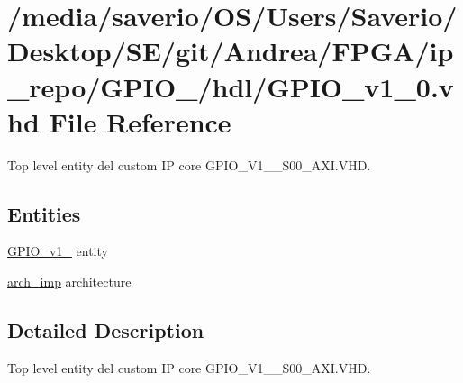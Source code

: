 \hypertarget{GPIO__v1__0_8vhd}{}\section{/media/saverio/\+O\+S/\+Users/\+Saverio/\+Desktop/\+S\+E/git/\+Andrea/\+F\+P\+G\+A/ip\+\_\+repo/\+G\+P\+I\+O\+\_/hdl/\+G\+P\+I\+O\+\_\+v1\+\_\+0.vhd File Reference}
\label{GPIO__v1__0_8vhd}


Top level entity del custom IP core G\+P\+I\+O\+\_\+\+V1\+\_\+\_\+\+S00\+\_\+\+A\+X\+I.\+V\+HD.  


\subsection*{Entities}
\begin{DoxyCompactItemize}
\item 
\hyperlink{classGPIO__v1__0}{G\+P\+I\+O\+\_\+v1\+\_} entity
\item 
\hyperlink{classGPIO__v1__0_1_1arch__imp}{arch\+\_\+imp} architecture
\end{DoxyCompactItemize}


\subsection{Detailed Description}
Top level entity del custom IP core G\+P\+I\+O\+\_\+\+V1\+\_\+\_\+\+S00\+\_\+\+A\+X\+I.\+V\+HD. 

